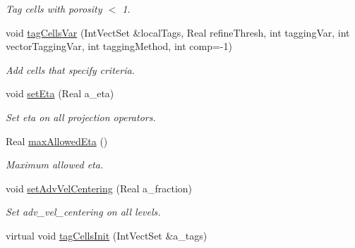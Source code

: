 \begin{DoxyCompactItemize}
\begin{DoxyCompactList}\small\item\em Tag cells with porosity $<$ 1. \end{DoxyCompactList}\item 
\hypertarget{class_a_m_r_level_mushy_layer_ac2a65f143504a09f92cb01907f15f124}{void \hyperlink{class_a_m_r_level_mushy_layer_ac2a65f143504a09f92cb01907f15f124}{tag\-Cells\-Var} (Int\-Vect\-Set \&local\-Tags, Real refine\-Thresh, int tagging\-Var, int vector\-Tagging\-Var, int tagging\-Method, int comp=-\/1)}\label{class_a_m_r_level_mushy_layer_ac2a65f143504a09f92cb01907f15f124}

\begin{DoxyCompactList}\small\item\em Add cells that specify criteria. \end{DoxyCompactList}\item 
void \hyperlink{class_a_m_r_level_mushy_layer_a5064704173348a8efa158f400983a101}{set\-Eta} (Real a\-\_\-eta)
\begin{DoxyCompactList}\small\item\em Set eta on all projection operators. \end{DoxyCompactList}\item 
\hypertarget{class_a_m_r_level_mushy_layer_a2771f661ce974eec626324cf2b07fd59}{Real \hyperlink{class_a_m_r_level_mushy_layer_a2771f661ce974eec626324cf2b07fd59}{max\-Allowed\-Eta} ()}\label{class_a_m_r_level_mushy_layer_a2771f661ce974eec626324cf2b07fd59}

\begin{DoxyCompactList}\small\item\em Maximum allowed eta. \end{DoxyCompactList}\item 
\hypertarget{class_a_m_r_level_mushy_layer_ac44c7ebcf787be031046fb732ac4aa96}{void \hyperlink{class_a_m_r_level_mushy_layer_ac44c7ebcf787be031046fb732ac4aa96}{set\-Adv\-Vel\-Centering} (Real a\-\_\-fraction)}\label{class_a_m_r_level_mushy_layer_ac44c7ebcf787be031046fb732ac4aa96}

\begin{DoxyCompactList}\small\item\em Set adv\-\_\-vel\-\_\-centering on all levels. \end{DoxyCompactList}\item 
\hypertarget{class_a_m_r_level_mushy_layer_a3239fcf9157c4b6174aba461e4e4b327}{virtual void \hyperlink{class_a_m_r_level_mushy_layer_a3239fcf9157c4b6174aba461e4e4b327}{tag\-Cells\-Init} (Int\-Vect\-Set \&a\-\_\-tags)}\label{class_a_m_r_level_mushy_layer_a3239fcf9157c4b6174aba461e4e4b327}


\end{DoxyCompactItemize}
